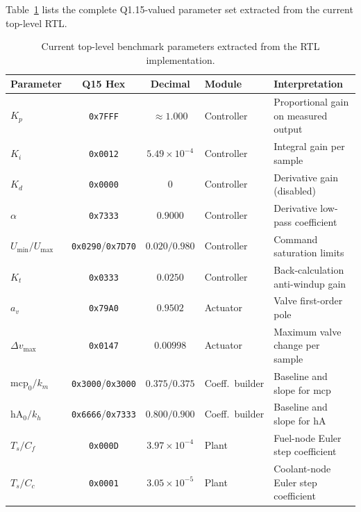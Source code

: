 Table~\ref{tab:bench_params} lists the complete Q1.15-valued parameter
set extracted from the current top-level RTL.

\begin{table}[h!]
  \centering
  \caption{Current top-level benchmark parameters extracted from the
           RTL implementation.}\label{tab:bench_params}
  \renewcommand{\arraystretch}{1.25}
  \begin{tabular}{@{} l c c l p{4.5cm} @{}}
    \toprule
    \textbf{Parameter} & \textbf{Q15 Hex} & \textbf{Decimal} &
    \textbf{Module} & \textbf{Interpretation} \\
    \midrule
    $K_p$              & \texttt{0x7FFF} & $\approx 1.000$          & Controller       & Proportional gain on measured output \\
    $K_i$              & \texttt{0x0012} & $5.49\times10^{-4}$      & Controller       & Integral gain per sample \\
    $K_d$              & \texttt{0x0000} & $0$                       & Controller       & Derivative gain (disabled) \\
    $\alpha$           & \texttt{0x7333} & $0.9000$                  & Controller       & Derivative low-pass coefficient \\
    $U_{\min}/U_{\max}$& \texttt{0x0290}/\texttt{0x7D70} & $0.020/0.980$ & Controller & Command saturation limits \\
    $K_t$              & \texttt{0x0333} & $0.0250$                  & Controller       & Back-calculation anti-windup gain \\
    $a_v$              & \texttt{0x79A0} & $0.9502$                  & Actuator         & Valve first-order pole \\
    $\Delta v_{\max}$  & \texttt{0x0147} & $0.00998$                 & Actuator         & Maximum valve change per sample \\
    $\mathrm{mcp}_0/k_m$ & \texttt{0x3000}/\texttt{0x3000} & $0.375/0.375$ & Coeff.\ builder & Baseline and slope for $\mathrm{mcp}$ \\
    $\mathrm{hA}_0/k_h$  & \texttt{0x6666}/\texttt{0x7333} & $0.800/0.900$ & Coeff.\ builder & Baseline and slope for $\mathrm{hA}$ \\
    $T_s/C_f$          & \texttt{0x000D} & $3.97\times10^{-4}$      & Plant            & Fuel-node Euler step coefficient \\
    $T_s/C_c$          & \texttt{0x0001} & $3.05\times10^{-5}$      & Plant            & Coolant-node Euler step coefficient \\

\end{tabular}
\end{table}
